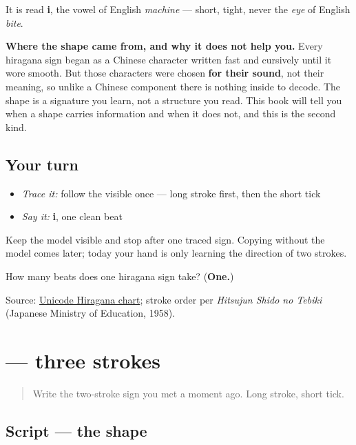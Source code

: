 It is read \textbf{i}, the vowel of English \emph{machine} — short, tight, never the \emph{eye} of English \emph{bite}.

\textbf{Where the shape came from, and why it does not help you.} Every hiragana sign began as a Chinese character written fast and cursively until it wore smooth. But those characters were chosen \textbf{for their sound}, not their meaning, so unlike a Chinese component there is nothing inside  to decode. The shape is a signature you learn, not a structure you read. This book will tell you when a shape carries information and when it does not, and this is the second kind.

\subsection*{Your turn}
\begin{itemize}
\raggedright
  \item \emph{Trace it:} follow the visible  once — long stroke first, then the short tick
  \item \emph{Say it:} \textbf{i}, one clean beat
\end{itemize}

Keep the model visible and stop after one traced sign. Copying without the model comes later; today your hand is only learning the direction of two strokes.

\begin{tcolorbox}[breakable,colback=teal!4,colframe=teal!35!black,title={Before you move on}]
How many beats does one hiragana sign take? (\textbf{One.})

Source: \href{https://www.unicode.org/charts/PDF/U3040.pdf}{Unicode Hiragana chart}; stroke order per \emph{Hitsujun Shido no Tebiki} (Japanese Ministry of Education, 1958).
\end{tcolorbox}
\section[\texorpdfstring{\ja{は} (ha)}{は (ha)}]{ — three strokes}

\label{lesson:JA-W01-ha}



\begin{quote}
Write the two-stroke sign you met a moment ago. Long stroke, short tick.
\end{quote}

\subsection*{Script — the shape}

